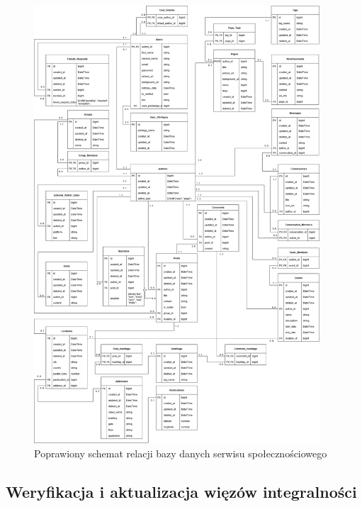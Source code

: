 \documentclass{article}
\begin{document}
\begin{figure}[htbp]
    \begin{center}
        \includegraphics[width=0.95\textwidth]{images/DiagramBazyDanych_8_2.png}
    \end{center}
    \caption{Poprawiony schemat relacji bazy danych serwisu społecznościowego}
    \label{fig:schemat_relacji}
\end{figure}

\subsection{Weryfikacja i aktualizacja więzów integralności}
\end{document}
